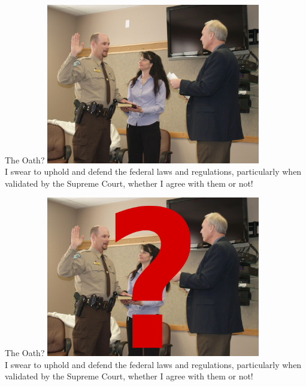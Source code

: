 \begin{frame}{The Oath?}
    \centering
    \includegraphics[width=0.7\textwidth]{img/oath.jpg} \\
    I swear to uphold and defend the federal laws and regulations, particularly when validated by the Supreme Court, whether I agree with them or not!
\end{frame}

\begin{frame}{The Oath?}
    \centering
    \includegraphics[width=0.7\textwidth]{img/oath-q.png} \\
    I swear to uphold and defend the federal laws and regulations, particularly when validated by the Supreme Court, whether I agree with them or not!
\end{frame}

